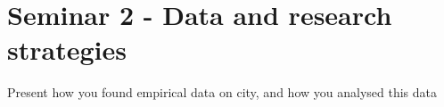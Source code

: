 \documentclass{article}
\begin{document}

\section{Seminar 2 - Data and research strategies}

\begin{outline}
	\1 Present how you found empirical data on city, and how you analysed this data
\end{outline}

\pagebreak

\printbibliography
\end{document}
